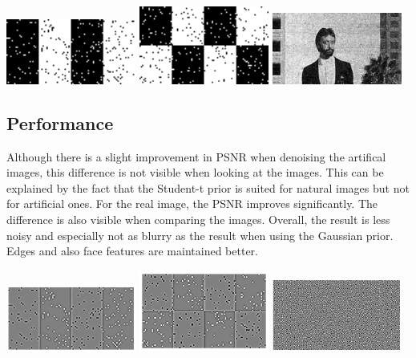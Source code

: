 \documentclass[a4paper,11pt, final]{scrartcl}
\begin{document}
\vspace{1cm}

{
\centering 
\includegraphics[width=0.32\textwidth]{ex4_stripes_mrf_student_filtered.png}
\includegraphics[width=0.32\textwidth]{ex4_checker_mrf_student_filtered.png}
\includegraphics[width=0.32\textwidth]{ex4_image_mrf_student_filtered.png}
}

\subsection*{Performance}
Although there is a slight improvement in PSNR when denoising the artifical images, this difference is not visible when looking at the images. This can be explained by the fact that the Student-t prior is suited for natural images but not for artificial ones.
For the real image, the PSNR improves significantly. The difference is also visible when comparing the images. Overall, the result is less noisy and especially not as blurry as the result when using the Gaussian prior. Edges and also face features are maintained better.

{
\centering 
\includegraphics[width=0.32\textwidth]{ex4_stripes_grad.png}
\includegraphics[width=0.32\textwidth]{ex4_checker_grad.png}
\includegraphics[width=0.32\textwidth]{ex4_image_grad.png}
}
\end{document}
